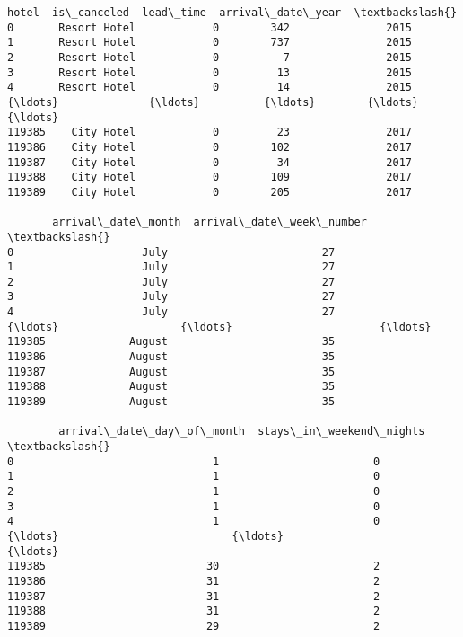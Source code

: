 \documentclass[11pt]{article}
\makeatletter
\newcommand{\boxspacing}{\kern\kvtcb@left@rule\kern\kvtcb@boxsep}
\newcommand{\prompt}[4]{
        {\ttfamily\llap{{\color{#2}[#3]:\hspace{3pt}#4}}\vspace{-\baselineskip}}
    }
\makeatother
\begin{document}
            \begin{tcolorbox}[breakable, size=fbox, boxrule=.5pt, pad at break*=1mm, opacityfill=0]
\prompt{Out}{outcolor}{6}{\boxspacing}
\begin{Verbatim}[commandchars=\\\{\}]
               hotel  is\_canceled  lead\_time  arrival\_date\_year  \textbackslash{}
0       Resort Hotel            0        342               2015
1       Resort Hotel            0        737               2015
2       Resort Hotel            0          7               2015
3       Resort Hotel            0         13               2015
4       Resort Hotel            0         14               2015
{\ldots}              {\ldots}          {\ldots}        {\ldots}                {\ldots}
119385    City Hotel            0         23               2017
119386    City Hotel            0        102               2017
119387    City Hotel            0         34               2017
119388    City Hotel            0        109               2017
119389    City Hotel            0        205               2017

       arrival\_date\_month  arrival\_date\_week\_number  \textbackslash{}
0                    July                        27
1                    July                        27
2                    July                        27
3                    July                        27
4                    July                        27
{\ldots}                   {\ldots}                       {\ldots}
119385             August                        35
119386             August                        35
119387             August                        35
119388             August                        35
119389             August                        35

        arrival\_date\_day\_of\_month  stays\_in\_weekend\_nights  \textbackslash{}
0                               1                        0
1                               1                        0
2                               1                        0
3                               1                        0
4                               1                        0
{\ldots}                           {\ldots}                      {\ldots}
119385                         30                        2
119386                         31                        2
119387                         31                        2
119388                         31                        2
119389                         29                        2


\end{Verbatim}
\end{tcolorbox}
\end{document}
